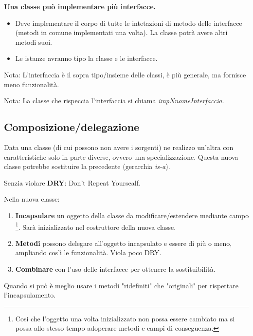 
\textbf{Una classe può implementare più interfacce.}

\begin{itemize}
	\item Deve implementare il corpo di tutte le intetazioni di metodo delle interfacce (metodi in comune implementati una volta). La classe potrà avere altri metodi suoi.
	\item Le istanze avranno tipo la classe e le interfacce.
\end{itemize}

Nota: L'interfaccia è il sopra tipo/insieme delle classi, è più generale, ma fornisce meno funzionalità.

Nota: La classe che rispeccia l'interfaccia si chiama \textit{impNnomeInterfaccia}.




\subsection{Composizione/delegazione}
Data una classe (di cui possono non avere i sorgenti) ne realizzo un'altra con caratteristiche solo in parte diverse, ovvero una specializzazione. Questa nuova classe potrebbe sostituire la precedente (gerarchia \textit{is-a}).

Senzia violare \textbf{DRY}: Don't Repeat Yoursealf.

Nella nuova classe:
\begin{enumerate}
	\item \textbf{Incapsulare} un oggetto della classe da modificare/estendere mediante campo \footnote{Cosi che l'oggetto una volta inizializzato non possa essere cambiato ma si possa allo stesso tempo adoperare metodi e campi di conseguenza.}. Sarà inizializzato nel costruttore della nuova classe.

	\item \textbf{Metodi} possono delegare all'oggetto incapsulato e essere di più o meno, ampliando cos'ì le funzionalità. Viola poco DRY.

	\item \textbf{Combinare} con l'uso delle interfacce per ottenere la sostituibilità.
\end{enumerate}
Quando si può è meglio usare i metodi "ridefiniti" che "originali" per rispettare l'incapsulamento.




